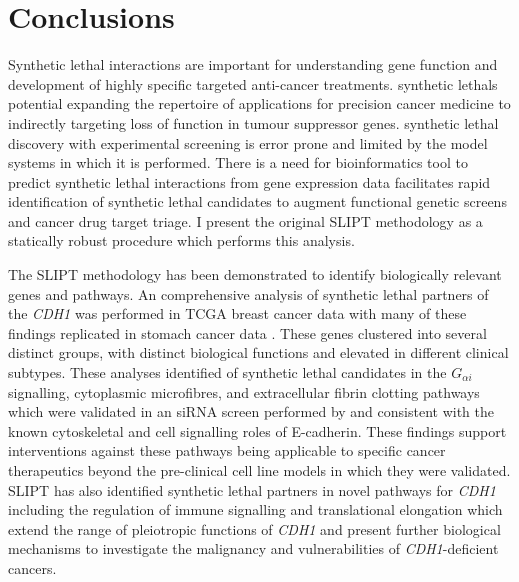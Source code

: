 \clearpage
\section{Conclusions}
\label{chap:conclusion}

Synthetic lethal interactions are important for understanding gene function and development of highly specific targeted anti-cancer \glspl{treatment}. \Glspl{synthetic lethal} potential expanding the repertoire of applications for precision cancer medicine to indirectly targeting loss of function in \gls{tumour suppressor} genes.  \Gls{synthetic lethal} discovery with experimental screening is error prone and limited by the model systems in which it is performed.  There is a need for \gls{bioinformatics} tool to predict \gls{synthetic lethal} interactions from \gls{gene expression} data facilitates rapid identification of \gls{synthetic lethal} candidates to augment functional genetic screens and cancer drug target triage. I present the original \acrfull{SLIPT} methodology as a statically robust procedure which performs this analysis.

The \gls{SLIPT} methodology has been demonstrated to identify biologically relevant genes and pathways. An comprehensive analysis of \gls{synthetic lethal} partners of the \textit{CDH1} was performed in \gls{TCGA} breast cancer data \citep{TCGA2012} with many of these findings replicated in stomach cancer data \citep{TCGA2014GC}. These genes clustered into several distinct groups, with distinct biological functions and elevated  in different clinical subtypes.  These analyses identified of \gls{synthetic lethal} candidates in the $G_{\alpha i}$ signalling, cytoplasmic microfibres, and extracellular fibrin clotting pathways which were validated in an \gls{siRNA} screen performed by \citet{Telford2015} and consistent with the known cytoskeletal and cell signalling roles of \gls{E-cadherin}. These findings support interventions against these pathways being applicable to specific cancer therapeutics beyond the pre-clinical cell line models in which they were validated. \gls{SLIPT} has also identified \gls{synthetic lethal} partners in novel pathways for \textit{CDH1} including the regulation of immune signalling and translational elongation which extend the range of pleiotropic functions of \textit{CDH1} and present further biological mechanisms to investigate the malignancy and vulnerabilities of \textit{CDH1}-deficient cancers.

